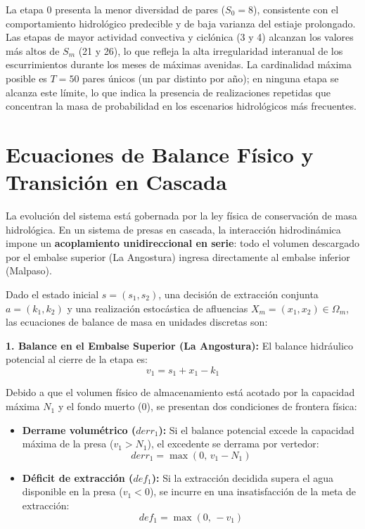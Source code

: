 \documentclass[
  spanish,
  letterpaper,
]{scrreprt}
\theoremstyle{definition}
\theoremstyle{remark}
\begin{document}
La etapa 0 presenta la menor diversidad de pares (\(S_0 = 8\)),
consistente con el comportamiento hidrológico predecible y de baja
varianza del estiaje prolongado. Las etapas de mayor actividad
convectiva y ciclónica (3 y 4) alcanzan los valores más altos de \(S_m\)
(21 y 26), lo que refleja la alta irregularidad interanual de los
escurrimientos durante los meses de máximas avenidas. La cardinalidad
máxima posible es \(T = 50\) pares únicos (un par distinto por año); en
ninguna etapa se alcanza este límite, lo que indica la presencia de
realizaciones repetidas que concentran la masa de probabilidad en los
escenarios hidrológicos más frecuentes.

\section{Ecuaciones de Balance Físico y Transición en
Cascada}\label{sec-transicion}

La evolución del sistema está gobernada por la ley física de
conservación de masa hidrológica. En un sistema de presas en cascada, la
interacción hidrodinámica impone un \textbf{acoplamiento unidireccional
en serie}: todo el volumen descargado por el embalse superior (La
Angostura) ingresa directamente al embalse inferior (Malpaso).

Dado el estado inicial \(s = (s_1, s_2)\), una decisión de extracción
conjunta \(a = (k_1, k_2)\) y una realización estocástica de afluencias
\(X_m = (x_1, x_2) \in \Omega_m\), las ecuaciones de balance de masa en
unidades discretas son:

\textbf{1. Balance en el Embalse Superior (La Angostura):} El balance
hidráulico potencial al cierre de la etapa es: \[v_1 = s_1 + x_1 - k_1\]

Debido a que el volumen físico de almacenamiento está acotado por la
capacidad máxima \(N_1\) y el fondo muerto (\(0\)), se presentan dos
condiciones de frontera física:

\begin{itemize}
\item
  \textbf{Derrame volumétrico (\(derr_1\)):} Si el balance potencial
  excede la capacidad máxima de la presa (\(v_1 > N_1\)), el excedente
  se derrama por vertedor: \[derr_1 = \max(0, \, v_1 - N_1)\]
\item
  \textbf{Déficit de extracción (\(def_1\)):} Si la extracción decidida
  supera el agua disponible en la presa (\(v_1 < 0\)), se incurre en una
  insatisfacción de la meta de extracción: \[def_1 = \max(0, \, -v_1)\]
\end{itemize}
\end{document}
